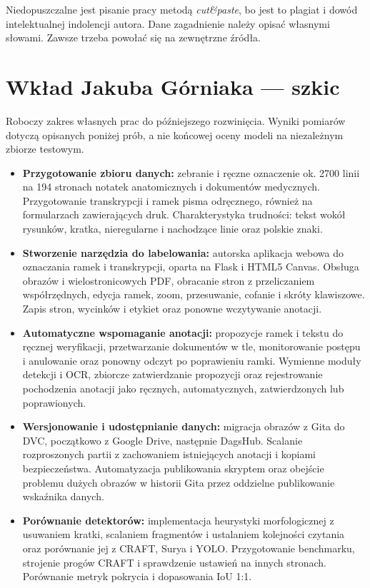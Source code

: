 Niedopuszczalne jest pisanie pracy metodą \emph{cut\&paste}, bo jest to plagiat i dowód intelektualnej indolencji autora.
Dane zagadnienie należy opisać własnymi słowami. Zawsze trzeba powołać się na zewnętrzne źródła. 

\section{Wkład Jakuba Górniaka --- szkic}

Roboczy zakres własnych prac do późniejszego rozwinięcia. Wyniki pomiarów
dotyczą opisanych poniżej prób, a nie końcowej oceny modeli na niezależnym
zbiorze testowym.

\begin{itemize}
	\item \textbf{Przygotowanie zbioru danych:} zebranie i ręczne oznaczenie
	ok. 2700 linii na 194 stronach notatek anatomicznych i dokumentów medycznych.
	Przygotowanie transkrypcji i ramek pisma odręcznego, również na formularzach
	zawierających druk. Charakterystyka trudności: tekst wokół rysunków,
	kratka, nieregularne i nachodzące linie oraz polskie znaki.

	\item \textbf{Stworzenie narzędzia do labelowania:} autorska aplikacja
	webowa do oznaczania ramek i transkrypcji, oparta na Flask i HTML5 Canvas.
	Obsługa obrazów i wielostronicowych PDF, obracanie stron z przeliczaniem
	współrzędnych, edycja ramek, zoom, przesuwanie, cofanie i skróty klawiszowe.
	Zapis stron, wycinków i etykiet oraz ponowne wczytywanie anotacji.

	\item \textbf{Automatyczne wspomaganie anotacji:} propozycje ramek
	i tekstu do ręcznej weryfikacji, przetwarzanie dokumentów w tle,
	monitorowanie postępu i anulowanie oraz ponowny odczyt po poprawieniu
	ramki. Wymienne moduły detekcji i OCR, zbiorcze zatwierdzanie propozycji
	oraz rejestrowanie pochodzenia anotacji jako ręcznych, automatycznych,
	zatwierdzonych lub poprawionych.

	\item \textbf{Wersjonowanie i udostępnianie danych:} migracja obrazów
	z Gita do DVC, początkowo z Google Drive, następnie DagsHub. Scalanie
	rozproszonych partii z zachowaniem istniejących anotacji i kopiami
	bezpieczeństwa. Automatyzacja publikowania skryptem oraz obejście
	problemu dużych obrazów w historii Gita przez oddzielne publikowanie
	wskaźnika danych.

	\item \textbf{Porównanie detektorów:} implementacja heurystyki
	morfologicznej z usuwaniem kratki, scalaniem fragmentów i ustalaniem
	kolejności czytania oraz porównanie jej z CRAFT, Surya i YOLO.
	Przygotowanie benchmarku, strojenie progów CRAFT i sprawdzenie ustawień
	na innych stronach. Porównanie metryk pokrycia i dopasowania IoU 1:1.


\end{itemize}
